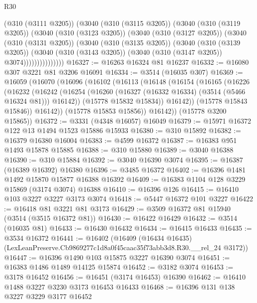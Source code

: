 \begin{lexlean}{R30}
\begin{coremodule}
                (@310 (@3111 @3205))
                (@3040
                  (@310 (@3115 @3205))
                  (@3040
                    (@310 (@3119 @3205))
                    (@3040
                      (@310 (@3123 @3205))
                      (@3040
                        (@310 (@3127 @3205))
                        (@3040
                          (@310 (@3131 @3205))
                          (@3040
                            (@310 (@3135 @3205))
                            (@3040
                              (@310 (@3139 @3205))
                              (@3040
                                (@310 (@3143 @3205))
                                (@3040 (@310 (@3147 @3205)) @3074)))))))))))))))
@16327 := @16263 @16324 @81 @16237
@16332 := @16080 @307 @3221 @81 @3206 @16091
@16334 := @3514 (@16035 @307)
@16369 := @16059
    (@16070
      (@16096
        (@16102
          (@16113
            (@16148
              (@16154
                (@16165
                  (@16226
                    (@16232
                      (@16242
                        (@16254 (@16260 (@16327 (@16332 @16334) (@3514 (@5466 @16324 @81))) @16142))
                        (@15778 @15832 @15834))
                      @16142))
                  (@15778 @15843 @15846))
                @16142))
            (@15778 @15853 @15856))
          @16142))
      (@15778 @3200 @15865))
@16372 := @3331 (@4348 @16057) @16049
@16379 := @15971 @16372 @122 @13 @1494 @1523 @15886 @15933
@16380 := @310 @15892
@16382 := @16379 @16380 @16004
@16383 := @4599 @16372
@16387 := @16383 @951 @1493 @15878 @15885
@16388 := @310 @15880
@16389 := @3040 @16388
@16390 := @310 @15884
@16392 := @3040 @16390 @3074
@16395 := @16387 (@16389 @16392) @16380
@16396 := @3485 @16372
@16402 := @16396 @1481 @1492 @15870 @15877 @16388 @16392
@16409 := @16383 @1104 @128 @3229 @15869 (@3174 @3074) @16388
@16410 := @16396 @126
@16415 := @16410 @103 @3227 @3227 @3173 @3074
@16418 := @5447 @16372 @101 @3227
@16422 := @16418 @81 @3221 @81 @3173
@16429 := @3509 @16372 @81 @15940 (@3514 (@3515 @16372 @81))
@16430 := @16422 @16429
@16432 := @3514 (@16035 @81)
@16433 := @16430 @16432
@16434 := @16415 @16433
@16435 := @3534 @16372
@16441 := @16402
    (@16409 (@16434 @16435) (LexLeanPreserve.Cb9869277c1d8a0f45caac35f73abb3d8.R30.__rel_24 @3172))
@16447 := @16396 @1490 @103 @15875 @3227 @16390 @3074
@16451 := @16383 @1486 @1489 @14125 @15874
@16452 := @3182 @3074
@16453 := @3178 @16452
@16456 := @16451 (@3174 @16453) @16390
@16462 := @16410 @1488 @3227 @3230 @3173 @16453 @16433
@16468 := @16396 @131 @138 @3227 @3229 @3177 @16452

\end{coremodule}
\end{lexlean}
